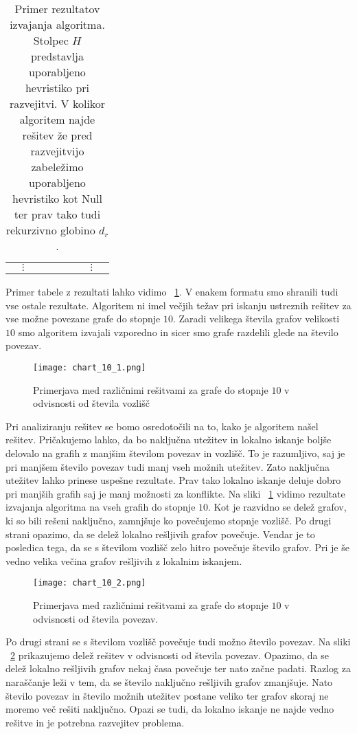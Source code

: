 \documentclass[12pt,a4paper,twoside]{article}
\theoremstyle{definition} %
\theoremstyle{plain} %
\numberwithin{equation}{section}  %
\begin{document}
\begin{table}[]
\begin{tabular}{lllllllll}
                                   & $\vdots$                          &                                   &                                      &                                 &                                         &                                       & $\vdots$                              &                                    
\end{tabular}
\label{tbl:res}
\caption{Primer rezultatov izvajanja algoritma. Stolpec $H$ predstavlja uporabljeno hevristiko pri razvejitvi. V kolikor algoritem najde rešitev že pred razvejitvijo zabeležimo uporabljeno hevristiko kot Null ter prav tako tudi rekurzivno globino $d_r$.}
\end{table}
Primer tabele z rezultati lahko vidimo  ~\ref{tbl:res}. V enakem formatu smo shranili tudi vse ostale rezultate.
Algoritem ni imel večjih težav pri iskanju ustreznih rešitev za vse možne povezane grafe do stopnje $10$. Zaradi velikega števila grafov velikosti $10$ smo algoritem izvajali vzporedno in sicer smo grafe razdelili glede na število povezav.
 \begin{figure}[h!]
\caption{Primerjava med različnimi rešitvami za grafe do stopnje $10$ v odvisnosti od števila vozlišč}
\label{chart_10_1}
\centering
    \texttt{[image: chart\_10\_1.png]}
    \end{figure}

Pri analiziranju rešitev se bomo osredotočili na to, kako je algoritem našel rešitev. Pričakujemo lahko, da bo naključna utežitev in lokalno iskanje boljše delovalo na grafih z manjšim številom povezav in vozlišč. To je razumljivo, saj je pri manjšem število povezav tudi manj vseh možnih utežitev. Zato naključna utežitev lahko prinese uspešne rezultate. Prav tako lokalno iskanje deluje dobro pri manjših grafih saj je manj možnosti za konflikte. Na sliki ~\ref{chart_10_1} vidimo rezultate izvajanja algoritma na vseh grafih do stopnje $10$. Kot je razvidno se delež grafov, ki so bili rešeni naključno, zamnjšuje ko povečujemo stopnje vozlišč. Po drugi strani opazimo, da se delež lokalno rešljivih grafov povečuje. Vendar je to posledica tega, da se s številom vozlišč zelo hitro povečuje število grafov. Pri je še vedno velika večina grafov rešljivih z lokalnim iskanjem.
 \begin{figure}[h!]
\caption{Primerjava med različnimi rešitvami za grafe do stopnje $10$ v odvisnosti od števila povezav.}
\label{chart_10_2}
\centering
    \texttt{[image: chart\_10\_2.png]}
    \end{figure}
Po drugi strani se s številom vozlišč povečuje tudi možno število povezav. Na sliki ~\ref{chart_10_2} prikazujemo delež rešitev v odvisnosti od števila povezav. Opazimo, da se delež lokalno rešljivih grafov nekaj časa povečuje ter nato začne padati. Razlog za naraščanje leži v tem, da se število naključno rešljivih grafov zmanjšuje. Nato število povezav in število možnih utežitev postane veliko ter grafov skoraj ne moremo več rešiti naključno. Opazi se tudi, da lokalno iskanje ne najde vedno rešitve in je potrebna razvejitev problema.
\end{document}
